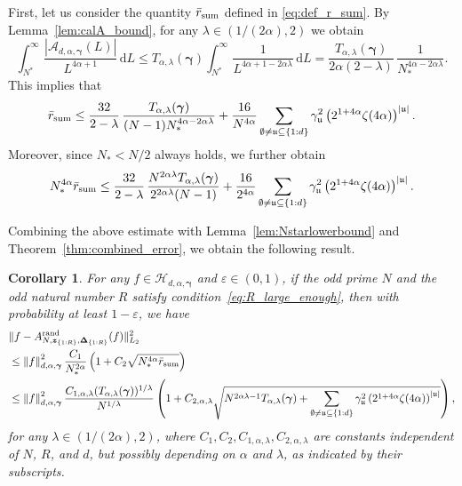 \documentclass[a4paper,11pt]{article}
\newtheorem{corollary}[theorem]{Corollary}
\newcommand{\rd}{\, \mathrm{d}}
\newcommand{\rand}{\mathrm{rand}}
\newcommand{\bsz}{\boldsymbol{z}}
\newcommand{\bsgamma}{\boldsymbol{\gamma}}
\newcommand{\bsDelta}{\boldsymbol{\Delta}}
\newcommand{\Acal}{\mathcal{A}}
\newcommand{\Hcal}{\mathcal{H}}
\newcommand{\fraku}{\mathfrak{u}}
\newcommand{\abs}[1]{\left\vert#1\right\vert}
\newcommand{\norm}[1]{\left\Vert#1\right\Vert}
\begin{document}
First, let us consider the quantity $\Bar{r}_{\mathrm{sum}}$ defined in \eqref{eq:def_r_sum}.
By Lemma~\ref{lem:calA_bound}, for any $\lambda \in (1/(2\alpha),2)$ we obtain
\[ 
\int_{N^\ast}^\infty \frac{\abs{\Acal_{d,\alpha,\bsgamma}(L)}}{L^{4\alpha +1}}\rd L
\le  T_{\alpha,\lambda}(\bsgamma) \int_{N^\ast}^\infty \frac{1}{L^{4\alpha +1-2\alpha\lambda}}\rd L 
= \frac{T_{\alpha,\lambda}(\bsgamma)}{2\alpha(2-\lambda)}\, \frac{1}{N_*^{4\alpha-2\alpha\lambda}}. 
\]
This implies that
\[
\Bar{r}_{\mathrm{sum}} \le 
\frac{32}{2-\lambda}\,\frac{T_{\alpha,\lambda}(\bsgamma)}{(N-1)N_*^{4\alpha-2\alpha\lambda}}
  +  \frac{16}{N^{4\alpha}} 
    \sum_{\emptyset \neq \fraku \subseteq \{1:d\}} \gamma^2_{\fraku}
\left(2^{1+4\alpha}\zeta(4\alpha)\right)^{\abs{\fraku}}.
\]
Moreover, since $N_* < N/2$ always holds, we further obtain
\[
N^{4\alpha}_*\Bar{r}_{\mathrm{sum}} 
\le 
\frac{32}{2-\lambda}\, \frac{N^{2\alpha\lambda} T_{\alpha,\lambda} (\bsgamma)}{2^{2\alpha\lambda}(N-1)}
+  \frac{16}{2^{4\alpha} } 
    \sum_{\emptyset \neq \fraku \subseteq \{1:d\}} \gamma^2_{\fraku}
\left(2^{1+4\alpha}\zeta(4\alpha)\right)^{\abs{\fraku}}.
\]

Combining the above estimate with Lemma~\ref{lem:Nstarlowerbound} and Theorem~\ref{thm:combined_error}, we obtain the following result.

\begin{corollary}\label{cor:L_2_bound}
For any $f \in \Hcal_{d,\alpha,\bsgamma}$ and $\varepsilon\in (0,1)$, if the odd prime $N$ and the odd natural number $R$ satisfy condition~\eqref{eq:R_large_enough}, then with probability at least $1-\varepsilon$, we have
\begin{align}
    & \|f-A^{\rand}_{N,\bsz_{\{1{:}R\}},\bsDelta_{\{1{:}R\}}}(f)\|^2_{L_2} \notag \\
    & \leq 
    \norm{f}^2_{d,\alpha,\bsgamma}
    \frac{C_1}{N^{2\alpha}_*}\left(1 + C_{2}\sqrt {N^{4\alpha}_*\Bar{r}_{\mathrm{sum}}}\right) \notag \\
    & \leq 
    \norm{f}^2_{d,\alpha,\bsgamma}
    \frac{C_{1,\alpha,\lambda}(T_{\alpha,\lambda}(\bsgamma))^{1/\lambda}}{N^{1/\lambda}}\left(1 + C_{2,\alpha,\lambda}\sqrt{N^{2\alpha\lambda-1}T_{\alpha,\lambda} (\bsgamma)+ \sum_{\emptyset \neq \fraku \subseteq \{1:d\}} \gamma^2_{\fraku}
\left(2^{1+4\alpha}\zeta(4\alpha)\right)^{\abs{\fraku}}}\right),\label{eq:overall_bound}
\end{align}
for any $\lambda \in (1/(2\alpha),2)$, where $C_1, C_2, C_{1,\alpha,\lambda}, C_{2,\alpha,\lambda}$ are constants independent of $N$, $R$, and $d$, but possibly depending on $\alpha$ and $\lambda$, as indicated by their subscripts.
\end{corollary}
\end{document}
